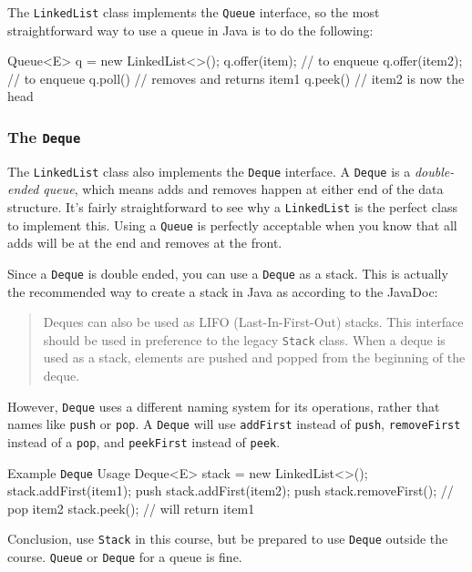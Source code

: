 The \texttt{LinkedList} class implements the \texttt{Queue} interface, so the most straightforward way to use a queue in Java is to do the following:
\begin{javacode}
Queue<E> q = new LinkedList<>();
q.offer(item); // to enqueue
q.offer(item2); // to enqueue
q.poll() // removes and returns item1
q.peek() // item2 is now the head
\end{javacode}

\subsubsection{The \texttt{Deque}}
The \texttt{LinkedList} class also implements the \texttt{Deque} interface.
A \texttt{Deque} is a \textit{double-ended queue}, which means adds and removes happen at either end of the data structure.
It's fairly straightforward to see why a \texttt{LinkedList} is the perfect class to implement this.
Using a \texttt{Queue} is perfectly acceptable when you know that all adds will be at the end and removes at the front.


Since a \texttt{Deque} is double ended, you can use a \texttt{Deque} as a stack. 
This is actually the recommended way to create a stack in Java as according to the JavaDoc:
\begin{quotation}
	Deques can also be used as LIFO (Last-In-First-Out) stacks. This interface should be used in preference to the legacy \texttt{Stack} class. When a deque is used as a stack, elements are pushed and popped from the beginning of the deque. 	
\end{quotation}


However, \texttt{Deque} uses a different naming system for its operations, rather that names like \texttt{push} or \texttt{pop}.  A \texttt{Deque} will use \texttt{addFirst} instead of \texttt{push}, \texttt{removeFirst} instead of a \texttt{pop}, and \texttt{peekFirst} instead of \texttt{peek}.


\begin{javacode}{Example \texttt{Deque} Usage}
Deque<E> stack = new LinkedList<>();
stack.addFirst(item1); push
stack.addFirst(item2); push
stack.removeFirst(); // pop item2
stack.peek(); // will return item1
\end{javacode}


Conclusion, use \texttt{Stack} in this course, but be prepared to use \texttt{Deque} outside the course.  \texttt{Queue} or \texttt{Deque} for a queue is fine.


